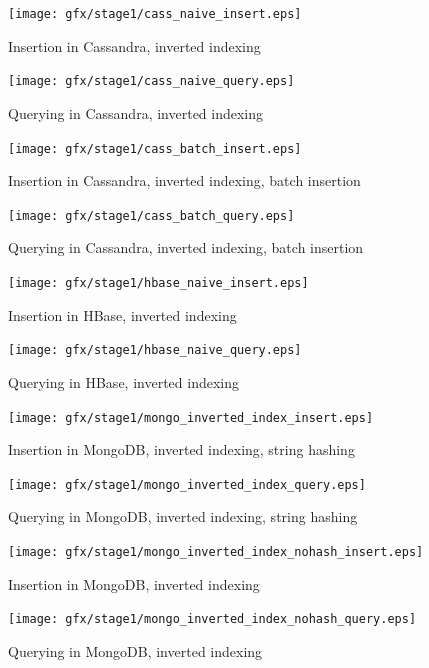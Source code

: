 \begin{figure}
    \centering
    \texttt{[image: gfx/stage1/cass\_naive\_insert.eps]}
    \caption{Insertion in Cassandra, inverted indexing}
\end{figure}
\begin{figure}
    \centering
    \texttt{[image: gfx/stage1/cass\_naive\_query.eps]}
    \caption{Querying in Cassandra, inverted indexing}
\end{figure}
\clearpage

\begin{figure}
    \centering
    \texttt{[image: gfx/stage1/cass\_batch\_insert.eps]}
    \caption{Insertion in Cassandra, inverted indexing, batch insertion}
\end{figure}\begin{figure}
    \centering
    \texttt{[image: gfx/stage1/cass\_batch\_query.eps]}
    \caption{Querying in Cassandra, inverted indexing, batch insertion}
\end{figure}
\clearpage

\begin{figure}
    \centering
    \texttt{[image: gfx/stage1/hbase\_naive\_insert.eps]}
    \caption{Insertion in HBase, inverted indexing}
\end{figure}
\begin{figure}
    \centering
    \texttt{[image: gfx/stage1/hbase\_naive\_query.eps]}
    \caption{Querying in HBase, inverted indexing}
\end{figure}
\clearpage

\begin{figure}
    \centering
    \texttt{[image: gfx/stage1/mongo\_inverted\_index\_insert.eps]}
    \caption{Insertion in MongoDB, inverted indexing, string hashing}
\end{figure}
\begin{figure}
    \centering
    \texttt{[image: gfx/stage1/mongo\_inverted\_index\_query.eps]}
    \caption{Querying in MongoDB, inverted indexing, string hashing}
\end{figure}
\clearpage

\begin{figure}
    \centering
    \texttt{[image: gfx/stage1/mongo\_inverted\_index\_nohash\_insert.eps]}
    \caption{Insertion in MongoDB, inverted indexing}
\end{figure}
\begin{figure}
    \centering
    \texttt{[image: gfx/stage1/mongo\_inverted\_index\_nohash\_query.eps]}
    \caption{Querying in MongoDB, inverted indexing}
\end{figure}
\clearpage

